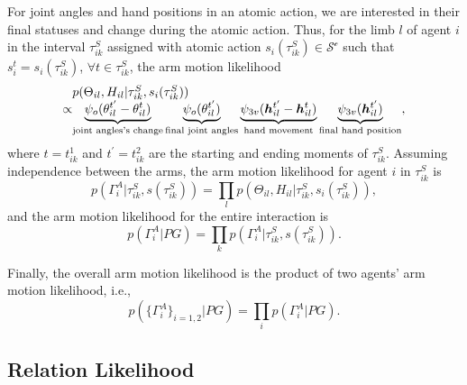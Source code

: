 \documentclass[letterpaper, 10 pt, conference]{ieeeconf}  %
\def \hb{\bm{h}} %
\begin{document}
For joint angles and hand positions in an atomic action, we are interested in their final statuses and change during the atomic action. Thus, for the limb $l$ of agent $i$ in the interval $\tau^S_{ik}$ assigned with atomic action $s_i(\tau_{ik}^S) \in \mathcal{S^c}$ such that $s_i^t = s_i(\tau_{ik}^S)$, $\forall t \in \tau^S_{ik}$, the arm motion likelihood
\begin{equation}
\setlength{\arraycolsep}{0pt}
\begin{array}{lcl}
&&p(\Theta_{il}, H_{il} |  \tau^S_{ik}, s_i(\tau_{ik}^S))\\ &\propto&\underbrace{\psi_o(\theta_{il}^{t^\prime} - \theta_{il}^t)}_{\text{joint angles's change}} \underbrace{\psi_o( \theta_{il}^{t^\prime})}_{\text{final joint angles}} \underbrace{\psi_{3v}(\hb_{il}^{t^\prime} - \hb_{il}^{t})}_{\text{hand movement}} \underbrace{\psi_{3v}( \hb_{il}^{t^\prime})}_{\text{final hand position}},
\end{array}
\label{eq:motion_ll_limb}
\end{equation}
where $t = t_{ik}^1$ and $t^\prime = t_{ik}^2$ are the starting and ending moments of $\tau^S_{ik}$. Assuming independence between the arms, the arm motion likelihood for agent $i$ in $\tau_{ik}^S$ is
\begin{equation}
p(\Gamma_i^A| \tau^S_{ik}, s(\tau_{ik}^S) ) = \prod_l p(\Theta_{il}, H_{il} |  \tau^S_{ik}, s_i(\tau_{ik}^S)),
\label{eq:motion_ll_interval}
\end{equation}
and the arm motion likelihood for the entire interaction is
\begin{equation}
p(\Gamma_i^A| PG) = \prod_k p(\Gamma_i^A| \tau^S_{ik}, s(\tau_{ik}^S) ).
\label{eq:motion_ll_agent}
\end{equation}

Finally, the overall arm motion likelihood is the product of two agents' arm motion likelihood, i.e.,
\begin{equation}
p(\{\Gamma_i^A\}_{i=1,2} | PG) = \prod_i p(\Gamma_i^A | PG).
\end{equation}

\subsection{Relation Likelihood}
\end{document}

